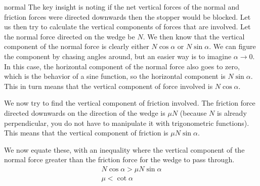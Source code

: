 \begin{solution}{normal}
The key insight is noting if the net vertical forces of the normal and friction forces were directed downwards then the stopper would be blocked. Let us then try to calculate the vertical components of forces that are involved. Let the normal force directed on the wedge be $N$. We then know that the vertical component of the normal force is clearly either $N\cos\alpha$ or $N\sin\alpha.$ We can figure the component by chasing angles around, but an easier way is to imagine $\alpha\to 0.$ In this case, the horizontal component of the normal force also goes to zero, which is the behavior of a sine function, so the horizontal component is $N\sin\alpha.$ This in turn means that the vertical component of force involved is $N\cos\alpha$.
\vspace{3mm}

We now try to find the vertical component of friction involved. The friction force directed downwards on the direction of the wedge is $\mu N$ (because $N$ is already perpendicular, you do not have to manipulate it with trigonometric functions). This means that the vertical component of friction is $\mu N\sin\alpha$. 
\vspace{3mm}

We now equate these, with an inequality where the vertical component of the normal force greater than the friction force for the wedge to pass through.
\begin{align*}
N\cos\alpha > \mu N \sin\alpha\\
\boxed{\mu < \cot\alpha}
\end{align*}
\end{solution}
